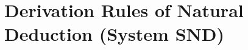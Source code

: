 







\section*{\hfill \normalsize \bf Derivation Rules of Natural Deduction (System SND) \hfill} 
\label{nd-proofrules}
				
